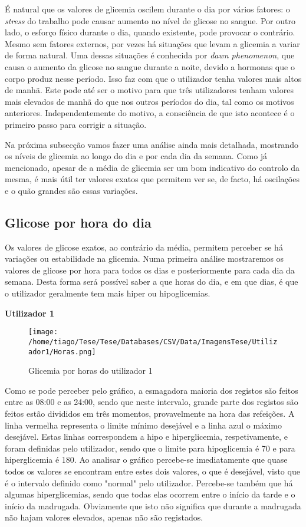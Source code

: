 É natural que os valores de glicemia oscilem durante o dia por vários fatores: o \textit{stress} do trabalho pode causar aumento no nível de glicose no sangue. Por outro lado, o esforço físico durante o dia, quando existente, pode provocar o contrário. Mesmo sem fatores externos, por vezes há situações que levam a glicemia a variar de forma natural. Uma dessas situações é conhecida por \textit{dawn phenomenon}, que causa o aumento da glicose no sangue durante a noite, devido a hormonas que o corpo produz nesse período. Isso faz com que o utilizador tenha valores mais altos de manhã. Este pode até ser o motivo para que três utilizadores tenham valores mais elevados de manhã do que nos outros períodos do dia, tal como os motivos anteriores. Independentemente do motivo, a consciência de que isto acontece é o primeiro passo para corrigir a situação.\newline



Na próxima subsecção vamos fazer uma análise ainda mais detalhada, mostrando os níveis de glicemia ao longo do dia e por cada dia da semana. Como já mencionado, apesar de a média de glicemia ser um bom indicativo do controlo da mesma, é mais útil ter valores exatos que permitem ver se, de facto, há oscilações e o quão grandes são essas variações.

\subsection{Glicose por hora do dia}

Os valores de glicose exatos, ao contrário da média, permitem perceber se há variações ou estabilidade na glicemia. Numa primeira análise mostraremos os valores de glicose por hora para todos os dias e posteriormente para cada dia da semana. Desta forma será possível saber a que horas do dia, e em que dias, é que o utilizador geralmente tem mais hiper ou hipoglicemias.\newpage

\textbf{Utilizador 1}

\begin{figure}[H]
\centering
\texttt{[image: /home/tiago/Tese/Tese/Databases/CSV/Data/ImagensTese/Utilizador1/Horas.png]}
\caption{Glicemia por horas do utilizador 1}
\end{figure}

Como se pode perceber pelo gráfico, a esmagadora maioria dos registos são feitos entre as 08:00 e as 24:00, sendo que neste intervalo, grande parte dos registos são feitos estão divididos em três momentos, provavelmente na hora das refeições. A linha vermelha representa o limite mínimo desejável e a linha azul o máximo desejável. Estas linhas correspondem a hipo e hiperglicemia, respetivamente, e foram definidas pelo utilizador, sendo que o limite para hipoglicemia é 70 e para hiperglicemia é 180. Ao analisar o gráfico percebe-se imediatamente que quase todos os valores se encontram entre estes dois valores, o que é desejável, visto que é o intervalo definido como "normal" pelo utilizador. Percebe-se também que há algumas hiperglicemias, sendo que todas elas ocorrem entre o início da tarde e o início da madrugada. Obviamente que isto não significa que durante a madrugada não hajam valores elevados, apenas não são registados. 


